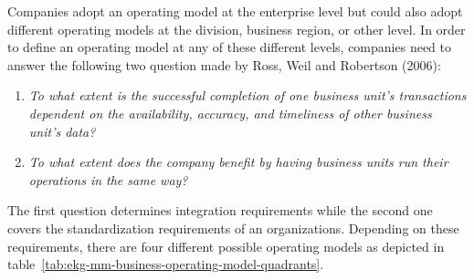 Companies adopt an operating model at the enterprise level but could also adopt different operating models
at the division, business region, or other level.
In order to define an operating model at any of these different levels, companies need to answer the following
two question made by Ross, Weil and Robertson (2006):

\begin{enumerate}
    \item \textit{To what extent is the successful completion of one business unit’s transactions dependent on the
          availability, accuracy, and timeliness of other business unit’s data?}
    \item \textit{To what extent does the company benefit by having business units run their operations in
          the same way?}
\end{enumerate}

The first question determines integration requirements while the second one covers the standardization requirements
of an organizations.
Depending on these requirements, there are four different possible operating models as depicted in
table~\ref{tab:ekg-mm-business-operating-model-quadrants}.

\newcommand{\tabitem}{\indent\llap{~~\textbullet~~}}

